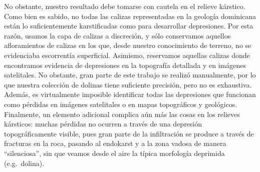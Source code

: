 \documentclass[spanish]{article}
\begin{document}
No obstante, nuestro resultado debe tomarse con cautela en el relieve
kárstico. Como bien es sabido, no todas las calizas representadas en la
geología dominicana están lo suficientemente karstificadas como para
desarrollar depresiones. Por esta razón, usamos la capa de calizas a
discreción, y sólo conservamos aquellos afloramientos de calizas en los
que, desde nuestro conocimiento de terreno, no se evidenciaba
escorrentía superficial. Asimismo, reservamos aquellas calizas donde
encontramos evidencia de depresiones en la topografía detallada y en
imágenes satelitales. No obstante, gran parte de este trabajo se realizó
manualmente, por lo que nuestra colección de dolinas tiene suficiente
precisión, pero no es exhaustiva. Además, es virtualmente imposible
identificar todas las depresiones que funcionan como pérdidas en
imágenes satelitales o en mapas topográficos y geológicos. Finalmente,
un elemento adicional complica aún más las cosas en los relieves
kársticos: muchas pérdidas no ocurren a través de una depresión
topográficamente visible, pues gran parte de la infiltración se produce
a través de fracturas en la roca, pasando al endokarst y a la zona
vadosa de manera ``silenciosa'', sin que veamos desde el aire la típica
morfología deprimida (e.g.~dolina).
\end{document}
